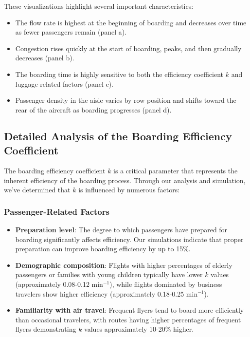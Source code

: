 \documentclass[12pt,a4paper]{article}
\begin{document}
These visualizations highlight several important characteristics:

\begin{itemize}
    \item The flow rate is highest at the beginning of boarding and decreases over time as fewer passengers remain (panel a).
    \item Congestion rises quickly at the start of boarding, peaks, and then gradually decreases (panel b).
    \item The boarding time is highly sensitive to both the efficiency coefficient $k$ and luggage-related factors (panel c).
    \item Passenger density in the aisle varies by row position and shifts toward the rear of the aircraft as boarding progresses (panel d).
\end{itemize}

\subsection{Detailed Analysis of the Boarding Efficiency Coefficient}
The boarding efficiency coefficient $k$ is a critical parameter that represents the inherent efficiency of the boarding process. Through our analysis and simulation, we've determined that $k$ is influenced by numerous factors:

\subsubsection{Passenger-Related Factors}
\begin{itemize}
\item \textbf{Preparation level}: The degree to which passengers have prepared for boarding significantly affects efficiency. Our simulations indicate that proper preparation can improve boarding efficiency by up to 15\%.

\item \textbf{Demographic composition}: Flights with higher percentages of elderly passengers or families with young children typically have lower $k$ values (approximately 0.08-0.12 min$^{-1}$), while flights dominated by business travelers show higher efficiency (approximately 0.18-0.25 min$^{-1}$).

\item \textbf{Familiarity with air travel}: Frequent flyers tend to board more efficiently than occasional travelers, with routes having higher percentages of frequent flyers demonstrating $k$ values approximately 10-20\% higher.
\end{itemize}
\end{document}
